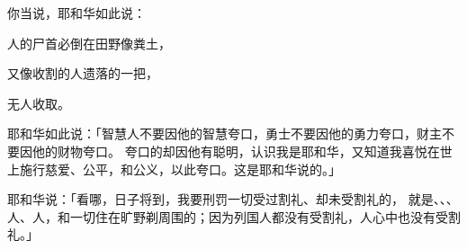 {\par }{\Q {}你当说，耶和华如此说：
\par }{\Q 人的尸首必倒在田野像粪土，
\par }{\Q 又像收割的人遗落的一把{}，
\par }{\Q 无人收取。
\par }{\PP {}耶和华如此说：「智慧人不要因他的智慧夸口，勇士不要因他的勇力夸口，财主不要因他的财物夸口。
夸口的却因他有聪明，认识我是耶和华，又知道我喜悦在世上施行慈爱、公平，和公义，以此夸口。这是耶和华说的。」
\par }{\PP {}耶和华说：「看哪，日子将到，我要刑罚一切受过割礼、{}却未受割礼的，
就是{}、{}、{}、{}人、{}人，和一切住在旷野剃周围{}的；因为列国人都没有受割礼，{}人心中也没有受割礼。」

}
